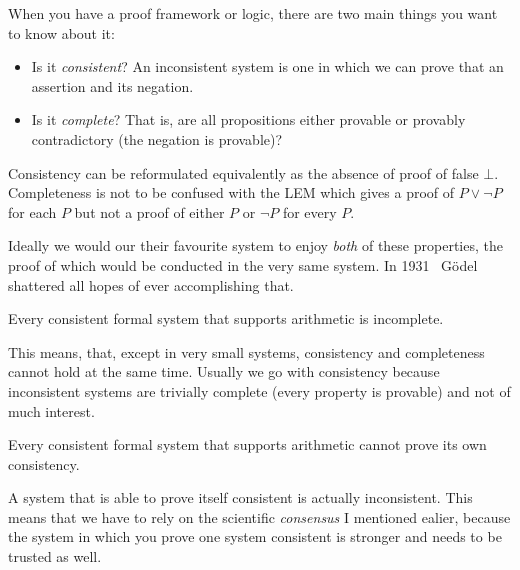 When you have a proof framework or logic, there are two main things you want to
know about it:
\begin{itemize}
  \item Is it \emph{consistent}? An inconsistent system is one in which we can
  prove that an assertion and its negation.
  \item Is it \emph{complete}? That is, are all propositions either provable
  or provably contradictory (\ie the negation is provable)?
\end{itemize}

Consistency can be reformulated equivalently as the absence of proof of false
\(\bot\).
Completeness is not to be confused with the \acrshort{LEM} which gives a proof
of \(P \vee \neg P\) for each \(P\) but not a proof of either \(P\) or
\(\neg P\) for every \(P\).

Ideally we would our their favourite system to enjoy \emph{both} of these
properties, the proof of which would be conducted in the very same system.
In 1931~ Gödel shattered all hopes of ever
accomplishing that.

\begin{theorem}
  Every consistent formal system that supports arithmetic is incomplete.
\end{theorem}

This means, that, except in very small systems, consistency and completeness
cannot hold at the same time. Usually we go with consistency because
inconsistent systems are trivially complete (every property is provable) and not
of much interest.

\begin{theorem}
  Every consistent formal system that supports arithmetic cannot prove its
  own consistency.
\end{theorem}
A system that is able to prove itself consistent is actually inconsistent.
This means that we have to rely on the scientific \emph{consensus} I mentioned
ealier, because the system in which you prove one system consistent is stronger
and needs to be trusted as well.

